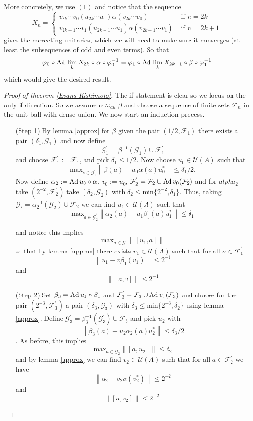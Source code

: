 \documentclass[11pt,a4paper,oneside]{amsart}
\newcommand{\Ad}{{\rm Ad\,}}
\newcommand{\norm}[1]{\left\|#1\right\|} %
\begin{document}
\begin{tcolorbox}[colback= Cyan! 20]
More concretely, we use $(1)$ and notice that the sequence $$X_n=\begin{cases} v_{2k}\cdots v_0 (u_{2k}\cdots u_0) \alpha(v_{2k}\cdots v_0)& \text{ if } n=2k \\v_{2k+1}\cdots v_1 (u_{2k+1}\cdots u_1) \alpha(v_{2k+1}\cdots v_1)& \text{ if } n=2k+1\end{cases}$$ gives the correcting unitaries, which we will need to make sure it converges (at least the subsequences of odd and even terms). So that $$\varphi_0\circ \Ad  \lim_k X_{2k} \circ \alpha \circ \varphi_0^{-1}= \varphi_1\circ \Ad \lim_k X_{2k+1} \circ \beta \circ \varphi_1^{-1}$$ which would give the desired result.
\end{tcolorbox}

\begin{proof}[Proof of theorem \ref{Evans-Kishimoto}] The if statement is clear so we focus on the only if direction. So we assume $\alpha \approx_{au} \beta$ and choose a sequence of finite sets $\mathcal F_n$ in the unit ball with dense union. We now start an induction process. \begin{enumerate}
\item[(Step 1)] By lemma \ref{approx} for $\beta$ given the pair $(1/2, \mathcal F_1)$ there exists a pair $(\delta_1, \mathcal G_1)$ and now define $$\mathcal G^{'}_1= \beta^{-1}(\mathcal G_1)\cup \mathcal F_1^{'}$$ and choose $\mathcal F_1^{'}:= \mathcal F_1$, and pick $\delta_1\leq 1/2$. Now choose $u_0\in \mathcal U (A)$ such that  $$\mathrm{max}_ {a\in \mathcal G_1^{'}}\norm {\beta(a)-u_0\alpha(a)u_0^*}\leq \delta_1/2.$$ Now define $\alpha_2:= \Ad u_0 \circ \alpha$, $v_0:= u_0$,  $\mathcal F_2^{'}= \mathcal F_2\cup \Ad v_0(\mathcal F_2)$ and for $alpha_2$ take $(2^{-2}, \mathcal F_2^{'})$ take $(\delta_2, \mathcal G_2)$ with $\delta_2\leq \mathrm{min}\{2^{-2}, \delta_1\}$. Thus, taking $\mathcal G_2^{'}=\alpha_2^{-1}(\mathcal G_2)\cup \mathcal F_2^{' }$ we can find $u_1\in \mathcal U (A)$ such that $$\mathrm{max}_{a\in \mathcal G_2^{'}}\norm {\alpha_2(a)-u_1\beta_1(a)u_1^*}\leq \delta_1$$

and notice this implies $$\mathrm{max}_{a\in \mathcal G_1}\norm{[u_1, a]}$$ so that by lemma \ref{approx} there exists $v_1\in \mathcal U(A)$ such that for all $a\in \mathcal F_1^{'}$ $$\norm{u_1-v\beta_1(v_1)}\leq 2^{-1}$$ and $$\norm{[a,v]}\leq 2^{-1}$$

\item[(Step 2)] Set $\beta_3= \Ad u_1\circ \beta_1$ and $\mathcal F_3^{'}=\mathcal F_3\cup \Ad v_1(\mathcal F_3)$ and choose for the pair $(2^{-3}, \mathcal F_3^{'})$ a pair $(\delta_3, \mathcal G_3)$ with $\delta_3\leq \mathrm{min}\{2^{-3}, \delta_2\}$ using lemma \ref{approx}. Define $\mathcal G_3 ^{'}= \beta_3^{-1}(\mathcal G_3 ^{'})\cup \mathcal F_3 ^{'}$ and pick $u_2$ with $$\norm{\beta_3(a)- u_2\alpha_2(a)u_2^*}\leq \delta_3/2$$. As before, this implies $$\mathrm{max}_{a\in \mathcal G_2}\norm{[a,u_2]}\leq \delta_2$$ and by lemma \ref{approx} we can find $v_2\in \mathcal U(A)$ such that for all $a\in \mathcal F_2^{'}$ we have $$\norm{u_2-v_2\alpha(v_2^*)}\leq 2^{-2}$$ and $$\norm{[a, v_2]}\leq 2^{-2}.$$


\end{enumerate}
\end{proof}
\end{document}
